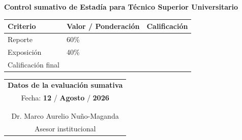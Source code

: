 \documentclass[12pt]{article}
\newcommand{\nasesorinstitucional}{Dr. Marco Aurelio Nuño-Maganda}
\newcommand{\DiaEvaluacionPesentacion}{12}
\newcommand{\MesEvaluacionPesentacion}{Agosto}
\newcommand{\AnhoEvaluacionPesentacion}{2026}
\begin{document}
\clearpage
{}

\vspace*{3cm}



\begin{center}
{\large \textbf{Control sumativo de Estadía para Técnico Superior Universitario}}
\end{center}

\vspace{0.5cm}

\begin{center}
\begin{tabular}{|p{6cm}|C{4cm}|C{4cm}|}
\hline
\textbf{Criterio} & \textbf{Valor / Ponderación} & \textbf{Calificación} \\ \hline
Reporte & 60\% & \\ \hline
Exposición & 40\% & \\ \hline
Calificación final &  \\ \hline
\end{tabular}
\end{center}

\vspace{0.8cm}


\begin{center}
\begin{tabular}{|p{10cm}|}
\hline
\multicolumn{1}{|c|}{\textbf{Datos de la evaluación sumativa}}\\
\multicolumn{1}{|c|}{Fecha: \textbf{\DiaEvaluacionPesentacion}  / \textbf{\MesEvaluacionPesentacion} / \textbf{\AnhoEvaluacionPesentacion}} \\ \hline
 \\
 \\ \hline
\multicolumn{1}{c}{\nasesorinstitucional}   \\
\multicolumn{1}{c}{Asesor institucional}   \\
\end{tabular}
\end{center}





\end{document}
